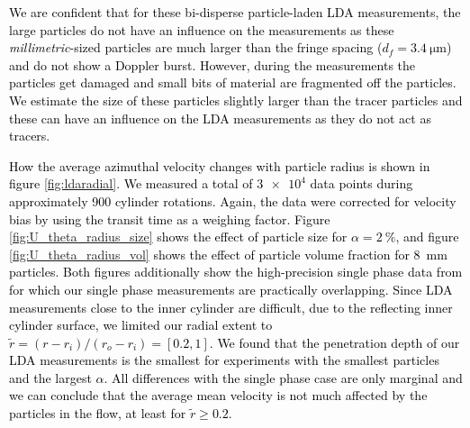 \documentclass{jfm}
\newcommand{\red}[1]{\textcolor{black}{#1}}
\begin{document}
\red{
We are confident that for these bi-disperse particle-laden LDA measurements,
the large particles do not have an influence on the measurements as these
\emph{millimetric}-sized particles are much larger than the fringe spacing
($d_f = \SI{3.4}{\micro\metre}$) and do not show a Doppler burst.  However,
during the measurements the particles get damaged and small bits of material
are fragmented off the particles. We estimate the size of these particles
slightly larger than the tracer particles and these can have an influence on
the LDA measurements as they do not act as tracers.
}

\red{
How the average azimuthal velocity changes with particle radius is shown in
figure \ref{fig:ldaradial}.  We measured a total of $\num{3e4}$ data points
during approximately 900 cylinder rotations. Again, the data were corrected
for velocity bias by using the transit time as a weighing factor. Figure
\ref{fig:U_theta_radius_size} shows the effect of particle size for
$\alpha=\SI{2}{\percent}$, and figure \ref{fig:U_theta_radius_vol} shows the
effect of particle volume fraction for \SI{8}{\milli\metre} particles. Both
figures additionally show the high-precision single phase data from
\cite{Huisman2013} for which our single phase measurements are practically
overlapping. Since LDA measurements close to the inner cylinder are difficult,
due to the reflecting inner cylinder surface, we limited our radial extent to
$\tilde{r}=(r - r_i) / (r_o - r_i)=[0.2,1]$. We found that the penetration
depth of our LDA measurements is the smallest for experiments with the
smallest particles and the largest $\alpha$. All differences with the single
phase case are only marginal and we can conclude that the average mean
velocity is not much affected by the particles in the flow, at least for
$\tilde{r} \geq 0.2$.}
\end{document}
